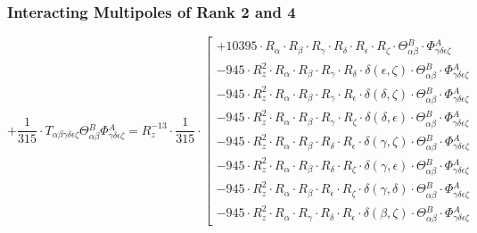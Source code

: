 \documentclass{article}
\begin{document}
\subsubsection*{Interacting Multipoles of Rank 2 and 4}
\begin{equation}
+ \frac{1}{315} \cdot T_{\alpha{}\beta{}\gamma{}\delta{}\epsilon{}\zeta{}} \Theta{}^{B}_{\alpha{}\beta{}} \Phi{}^{A}_{\gamma{}\delta{}\epsilon{}\zeta{}} = R_{z}^{-13} \cdot \frac{1}{315} \cdot  \left[ \begin{array}{c} 
 		+ 10395 \cdot R_{\alpha{}} \cdot R_{\beta{}} \cdot R_{\gamma{}} \cdot R_{\delta{}} \cdot R_{\epsilon{}} \cdot R_{\zeta{}} \cdot \Theta{}^{B}_{\alpha{}\beta{}} \cdot \Phi{}^{A}_{\gamma{}\delta{}\epsilon{}\zeta{}} 
 \\[0.2em] 		 - 945 \cdot R_{z}^{2} \cdot R_{\alpha{}} \cdot R_{\beta{}} \cdot R_{\gamma{}} \cdot R_{\delta{}} \cdot \delta{}\left(\epsilon{}, \zeta{}\right) \cdot \Theta{}^{B}_{\alpha{}\beta{}} \cdot \Phi{}^{A}_{\gamma{}\delta{}\epsilon{}\zeta{}} 
 \\[0.2em] 		 - 945 \cdot R_{z}^{2} \cdot R_{\alpha{}} \cdot R_{\beta{}} \cdot R_{\gamma{}} \cdot R_{\epsilon{}} \cdot \delta{}\left(\delta{}, \zeta{}\right) \cdot \Theta{}^{B}_{\alpha{}\beta{}} \cdot \Phi{}^{A}_{\gamma{}\delta{}\epsilon{}\zeta{}} 
 \\[0.2em] 		 - 945 \cdot R_{z}^{2} \cdot R_{\alpha{}} \cdot R_{\beta{}} \cdot R_{\gamma{}} \cdot R_{\zeta{}} \cdot \delta{}\left(\delta{}, \epsilon{}\right) \cdot \Theta{}^{B}_{\alpha{}\beta{}} \cdot \Phi{}^{A}_{\gamma{}\delta{}\epsilon{}\zeta{}} 
 \\[0.2em] 		 - 945 \cdot R_{z}^{2} \cdot R_{\alpha{}} \cdot R_{\beta{}} \cdot R_{\delta{}} \cdot R_{\epsilon{}} \cdot \delta{}\left(\gamma{}, \zeta{}\right) \cdot \Theta{}^{B}_{\alpha{}\beta{}} \cdot \Phi{}^{A}_{\gamma{}\delta{}\epsilon{}\zeta{}} 
 \\[0.2em] 		 - 945 \cdot R_{z}^{2} \cdot R_{\alpha{}} \cdot R_{\beta{}} \cdot R_{\delta{}} \cdot R_{\zeta{}} \cdot \delta{}\left(\gamma{}, \epsilon{}\right) \cdot \Theta{}^{B}_{\alpha{}\beta{}} \cdot \Phi{}^{A}_{\gamma{}\delta{}\epsilon{}\zeta{}} 
 \\[0.2em] 		 - 945 \cdot R_{z}^{2} \cdot R_{\alpha{}} \cdot R_{\beta{}} \cdot R_{\epsilon{}} \cdot R_{\zeta{}} \cdot \delta{}\left(\gamma{}, \delta{}\right) \cdot \Theta{}^{B}_{\alpha{}\beta{}} \cdot \Phi{}^{A}_{\gamma{}\delta{}\epsilon{}\zeta{}} 
 \\[0.2em] 		 - 945 \cdot R_{z}^{2} \cdot R_{\alpha{}} \cdot R_{\gamma{}} \cdot R_{\delta{}} \cdot R_{\epsilon{}} \cdot \delta{}\left(\beta{}, \zeta{}\right) \cdot \Theta{}^{B}_{\alpha{}\beta{}} \cdot \Phi{}^{A}_{\gamma{}\delta{}\epsilon{}\zeta{}} 

\end{array}
\end{equation}
\end{document}
